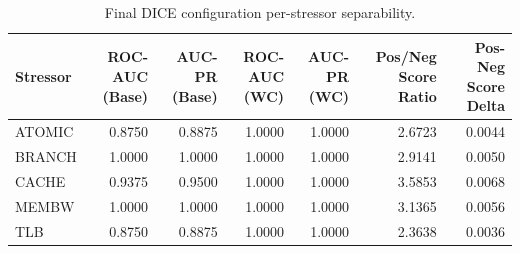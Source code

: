 \begin{table}[t]
\centering
\caption{Final DICE configuration per-stressor separability.}
\label{tab:dice_full_stressor}
\footnotesize
\begin{tabular}{lrrrrrr}
\toprule
Stressor & ROC-AUC (Base) & AUC-PR (Base) & ROC-AUC (WC) & AUC-PR (WC) & Pos/Neg Score Ratio & Pos-Neg Score Delta \\
\midrule
ATOMIC & 0.8750 & 0.8875 & 1.0000 & 1.0000 & 2.6723 & 0.0044 \\
BRANCH & 1.0000 & 1.0000 & 1.0000 & 1.0000 & 2.9141 & 0.0050 \\
CACHE & 0.9375 & 0.9500 & 1.0000 & 1.0000 & 3.5853 & 0.0068 \\
MEMBW & 1.0000 & 1.0000 & 1.0000 & 1.0000 & 3.1365 & 0.0056 \\
TLB & 0.8750 & 0.8875 & 1.0000 & 1.0000 & 2.3638 & 0.0036 \\
\bottomrule
\end{tabular}

\end{table}
